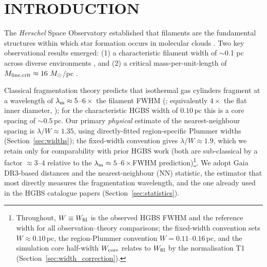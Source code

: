 \documentclass[usenatbib,twoside,twocolumn]{mnras}
\begin{document}
\section{INTRODUCTION}

The \textit{Herschel} Space Observatory established that filaments are the fundamental structures within which star formation occurs in molecular clouds \citep{Andre2010}. Two key observational results emerged: (1) a characteristic filament width of $\sim$0.1 pc across diverse environments \citep{Arzoumanian2011}, and (2) a critical mass-per-unit-length of $M_{\rm line,crit} \approx 16~M_\odot$/pc \citep{Ostriker1964}.

Classical fragmentation theory \citep{Inutsuka1992} predicts that isothermal gas cylinders fragment at a wavelength of $\lambda_{\rm m}\approx5$--$6\times$ the filament FWHM (\citealt{Fischera2012}; equivalently $4\times$ the flat inner diameter, \citealt{Inutsuka1992}); for the characteristic HGBS width of $0.10$\,pc this is a core spacing of $\sim0.5$\,pc. Our primary \emph{physical} estimate of the nearest-neighbour spacing is $\lambda/W\approx1.35$, using directly-fitted region-specific Plummer widths (Section~\ref{sec:widths}); the fixed-width convention gives $\lambda/W\approx1.9$, which we retain only for comparability with prior HGBS work (both are sub-classical by a factor $\approx3$--$4$ relative to the $\lambda_{\rm m}\approx5$--$6\times$FWHM prediction)\footnote{Throughout, $W\equiv W_{\rm fil}$ is the observed HGBS FWHM and the reference width for all observation--theory comparisons; the fixed-width convention sets $W\approx0.10$\,pc, the region-Plummer convention $W=0.11$--$0.16$\,pc, and the simulation core half-width $W_{\rm core}$ relates to $W_{\rm fil}$ by the normalisation T1 (Section~\ref{sec:width_correction}).}. We adopt Gaia DR3-based distances \citep{Zhang2023} and the nearest-neighbour (NN) statistic, the estimator that most directly measures the fragmentation wavelength, and the one already used in the HGBS catalogue papers \citep{Konyves2015,Konyves2020} (Section~\ref{sec:statistics}).
\end{document}
